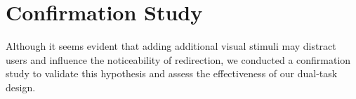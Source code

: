 

\section{Confirmation Study}
\label{section:formativestudy}

Although it seems evident that adding additional visual stimuli may distract users and influence the noticeability of redirection, we conducted a confirmation study to validate this hypothesis and assess the effectiveness of our dual-task design.




